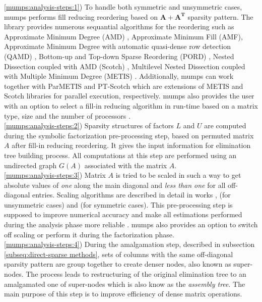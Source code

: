 \ref{mumps:analysis-steps:1}) To handle both symmetric and unsymmetric cases, \acrshort{mumps} performs fill reducing reordering based on $\boldsymbol{A} + \boldsymbol{A^T}$ sparsity pattern. The library provides numerous sequantial algorithms for the reordering such as Approximate Minimum Degree (AMD) \cite{reordering:AMD}, Approximate Minimum Fill (AMF), Approximate Minimum Degree with automatic quasi-dense row detection (QAMD) \cite{reordering:QAMD}, Bottom-up and Top-down Sparse Reordering (PORD) \cite{reordering:PORD}, Nested Dissection coupled with AMD (Scotch) \cite{reordering:SCOTCH}, Multilevel Nested Dissection coupled with Multiple Minimum Degree (METIS) \cite{reordering:METIS}. Additionally, \acrshort{mumps} can work together with ParMETIS and PT-Scotch which are extensions of METIS and Scotch libraries for parallel execution, respectively. \acrshort{mumps} also provides the user with an option to select a fill-in reducing algorithm in run-time based on a matrix type, size and the number of processors \cite{mumps-manual}.\\


\ref{mumps:analysis-steps:2}) Sparsity structures of factors $L$ and $U$ are computed during the symbolic factorization pre-processing step, based on permuted matrix $A$ after fill-in reducing reordering. It gives the input information for elimination tree building process.  All computations at this step are performed using an undirected graph $G(A)$ associated with the matrix $A$.\\


\ref{mumps:analysis-steps:3}) Matrix $A$ is tried to be scaled in such a way to get absolute values of \textit{one} along the main diagonal and \textit{less than one} for all off-diagonal entries. Scaling algorithms are described in detail in works \cite{mm:scaling:duff1999design}, \cite{mm:scaling:duff2001algorithms} (for  unsymmetric cases) and \cite{mm:scaling:duff2005strategies} (for  symmetric cases). This pre-processing step is supposed to improve numerical accuracy and make all estimations performed during the analysis phase more reliable \cite{mumps-manual}. \acrshort{mumps} also provides an option to switch off scaling or perform it during the factorization phase.\\



\ref{mumps:analysis-steps:4}) During the  amalgamation step, described in subsection \ref{subseq:direct-sparse methods}, sets of columns with the same off-diagonal sparsity pattern are group together to create denser nodes, also known as super-nodes. The process leads to restructuring of the original elimination tree to an amalgamated one of super-nodes which is also know as the \textit{assembly tree}. The main purpose of this step is to improve efficiency of dense matrix operations.\\



